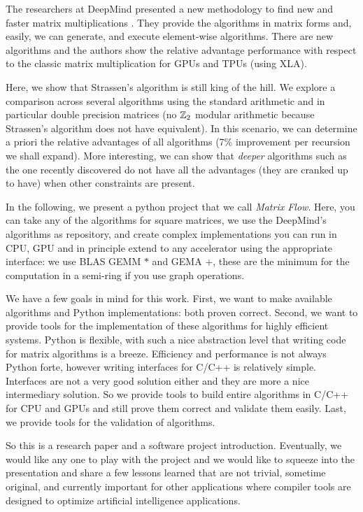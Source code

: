 \documentclass[acmsmall]{acmart}
\begin{document}
The researchers at DeepMind presented a new methodology to find new
and faster matrix multiplications \cite{PMID:36198780}. They provide
the algorithms in matrix forms and, easily, we can generate, and
execute element-wise algorithms.  There are new algorithms and the
authors show the relative advantage performance with respect to the
classic matrix multiplication for GPUs and TPUs (using XLA).

Here, we show that Strassen's algorithm \cite{STRASSEN1969} is still
king of the hill.  We explore a comparison across several algorithms
using the standard arithmetic and in particular double precision
matrices (no $\mathbb{Z}_2$ modular arithmetic because Strassen's algorithm
does not have equivalent). In this scenario, we can determine a priori
the relative advantages of all algorithms (7\% improvement per
recursion we shall expand). More interesting, we can show that {\em
  deeper} algorithms such as the one recently discovered do not have
all the advantages (they are cranked up to have) when other
constraints are present.

In the following, we present a python project that we call {\em Matrix
  Flow}. Here, you can take any of the algorithms for square matrices,
we use the DeepMind's algorithms as repository, and create complex
implementations you can run in CPU, GPU and in principle extend to any
accelerator using the appropriate interface: we use BLAS GEMM $*$ and
GEMA $+$, these are the minimum for the computation in a semi-ring if
you use graph operations.

We have a few goals in mind for this work. First, we want to make
available algorithms and Python implementations: both proven
correct. Second, we want to provide tools for the implementation of
these algorithms for highly efficient systems. Python is flexible,
with such a nice abstraction level that writing code for matrix
algorithms is a breeze. Efficiency and performance is not always
Python forte, however writing interfaces for C/C++ is relatively
simple. Interfaces are not a very good solution either and they are
more a nice intermediary solution. So we provide tools to build entire
algorithms in C/C++ for CPU and GPUs and still prove them correct and
validate them easily. Last, we provide tools for the validation of
algorithms.

So this is a research paper and a software project
introduction. Eventually, we would like any one to play with the
project and we would like to squeeze into the presentation and share a
few lessons learned that are not trivial, sometime original, and
currently important for other applications where compiler tools are
designed to optimize artificial intelligence applications.
\end{document}
